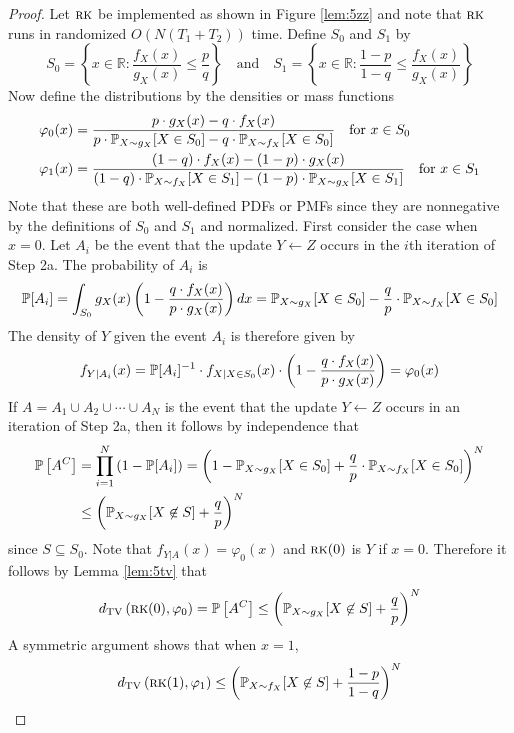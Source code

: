 \begin{proof}
Let $\textsc{rk}$ be implemented as shown in Figure \ref{lem:5zz} and note that $\textsc{rk}$ runs in randomized $O(N(T_1 + T_2))$ time. Define $S_0$ and $S_1$ by
$$S_0 = \left\{ x \in \mathbb{R} : \frac{f_X(x)}{g_X(x)} \le \frac{p}{q} \right\} \quad \text{and} \quad S_1 = \left\{ x \in \mathbb{R} : \frac{1 - p}{1 - q} \le \frac{f_X(x)}{g_X(x)} \right\}$$
Now define the distributions by the densities or mass functions
\begin{align*}
\varphi_0(x) &= \frac{p \cdot g_X(x) - q \cdot f_X(x)}{p \cdot \mathbb{P}_{X \sim g_X} [X \in S_0] - q \cdot \mathbb{P}_{X \sim f_X} [X \in S_0]} \quad \text{for } x \in S_0 \\
\varphi_1(x) &= \frac{(1 - q) \cdot f_X(x) - (1 - p) \cdot g_X(x)}{(1 - q) \cdot \mathbb{P}_{X \sim f_X} [X \in S_1] - (1 - p) \cdot \mathbb{P}_{X \sim g_X} [X \in S_1]} \quad \text{for } x \in S_1
\end{align*}
Note that these are both well-defined PDFs or PMFs since they are nonnegative by the definitions of $S_0$ and $S_1$ and normalized. First consider the case when $x = 0$. Let $A_i$ be the event that the update $Y \gets Z$ occurs in the $i$th iteration of Step 2a. The probability of $A_i$ is
$$\mathbb{P}[A_i] = \int_{S_0} g_X(x) \left( 1 - \frac{q \cdot f_X(x)}{p \cdot g_X(x)} \right) dx = \mathbb{P}_{X \sim g_X}[X \in S_0] - \frac{q}{p} \cdot \mathbb{P}_{X \sim f_X}[X \in S_0]$$
The density of $Y$ given the event $A_i$ is therefore given by
$$f_{Y|A_i}(x) = \mathbb{P}[A_i]^{-1} \cdot f_{X | X \in S_0}(x) \cdot \left( 1 - \frac{q \cdot f_X(x)}{p \cdot g_X(x)} \right) = \varphi_0(x)$$
If $A = A_1 \cup A_2 \cup \cdots \cup A_N$ is the event that the update $Y \gets Z$ occurs in an iteration of Step 2a, then it follows by independence that
\begin{align*}
\mathbb{P}\left[A^C\right] &= \prod_{i = 1}^N \left(1 - \mathbb{P}[A_i]\right) = \left( 1 - \mathbb{P}_{X \sim g_X}[X \in S_0] + \frac{q}{p} \cdot \mathbb{P}_{X \sim f_X}[X \in S_0] \right)^N \\
&\le \left( \mathbb{P}_{X \sim g_X}[X \not \in S] + \frac{q}{p} \right)^{N}
\end{align*}
since $S \subseteq S_0$. Note that $f_{Y|A}(x) = \varphi_0(x)$ and $\textsc{rk}(0)$ is $Y$ if $x = 0$. Therefore it follows by Lemma \ref{lem:5tv} that
$$d_{\text{TV}}\left( \textsc{rk}(0), \varphi_0 \right) = \mathbb{P}\left[A^C \right] \le \left( \mathbb{P}_{X \sim g_X}[X \not \in S] + \frac{q}{p} \right)^{N}$$
A symmetric argument shows that when $x = 1$,
$$d_{\text{TV}}\left( \textsc{rk}(1), \varphi_1 \right) \le \left( \mathbb{P}_{X \sim f_X}[X \not \in S] + \frac{1 - p}{1 - q} \right)^{N}$$

\end{proof}
